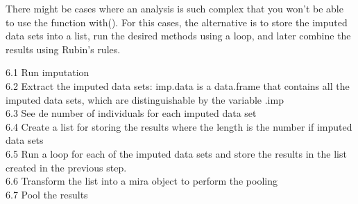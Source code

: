 \documentclass[
]{article}
\begin{document}
There might be cases where an analysis is such complex that you won't be
able to use the function with(). For this cases, the alternative is to
store the imputed data sets into a list, run the desired methods using a
loop, and later combine the results using Rubin's rules.

6.1 Run imputation\\
6.2 Extract the imputed data sets: imp.data is a data.frame that
contains all the imputed data sets, which are distinguishable by the
variable .imp\\
6.3 See de number of individuals for each imputed data set\\
6.4 Create a list for storing the results where the length is the number
if imputed data sets\\
6.5 Run a loop for each of the imputed data sets and store the results
in the list created in the previous step.\\
6.6 Transform the list into a mira object to perform the pooling\\
6.7 Pool the results
\end{document}
